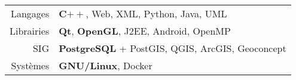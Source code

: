 
\begin{tabu} to 
  Langages & \textbf{C$++$}, Web, XML, Python, Java, UML\\
  Librairies & \textbf{Qt}, \textbf{OpenGL}, J2EE, Android, OpenMP\\
  SIG & \textbf{PostgreSQL} + PostGIS, QGIS, ArcGIS, Geoconcept\\
  Systèmes & \textbf{GNU/Linux}, Docker
\end{tabu}

